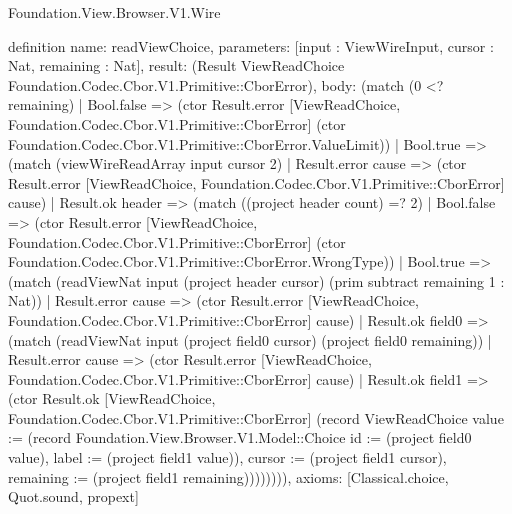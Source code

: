 \begin{lexlean}{Foundation.View.Browser.V1.Wire}
\begin{semanticmodule}
definition{
  name: readViewChoice,
  parameters: [input : ViewWireInput, cursor : Nat, remaining : Nat],
  result: (Result ViewReadChoice Foundation.Codec.Cbor.V1.Primitive::CborError),
  body: (match (0 <? remaining)
    | Bool.false => (ctor Result.error [ViewReadChoice, Foundation.Codec.Cbor.V1.Primitive::CborError] (ctor Foundation.Codec.Cbor.V1.Primitive::CborError.ValueLimit))
    | Bool.true => (match (viewWireReadArray input cursor 2)
      | Result.error cause => (ctor Result.error [ViewReadChoice, Foundation.Codec.Cbor.V1.Primitive::CborError] cause)
      | Result.ok header => (match ((project header count) =? 2)
        | Bool.false => (ctor Result.error [ViewReadChoice, Foundation.Codec.Cbor.V1.Primitive::CborError] (ctor Foundation.Codec.Cbor.V1.Primitive::CborError.WrongType))
        | Bool.true => (match (readViewNat input (project header cursor) (prim subtract remaining 1 : Nat))
          | Result.error cause => (ctor Result.error [ViewReadChoice, Foundation.Codec.Cbor.V1.Primitive::CborError] cause)
          | Result.ok field0 => (match (readViewNat input (project field0 cursor) (project field0 remaining))
            | Result.error cause => (ctor Result.error [ViewReadChoice, Foundation.Codec.Cbor.V1.Primitive::CborError] cause)
            | Result.ok field1 => (ctor Result.ok [ViewReadChoice, Foundation.Codec.Cbor.V1.Primitive::CborError] (record ViewReadChoice {value := (record Foundation.View.Browser.V1.Model::Choice {id := (project field0 value), label := (project field1 value)}), cursor := (project field1 cursor), remaining := (project field1 remaining)}))))))),
  axioms: [Classical.choice, Quot.sound, propext]
}


\end{semanticmodule}
\end{lexlean}
